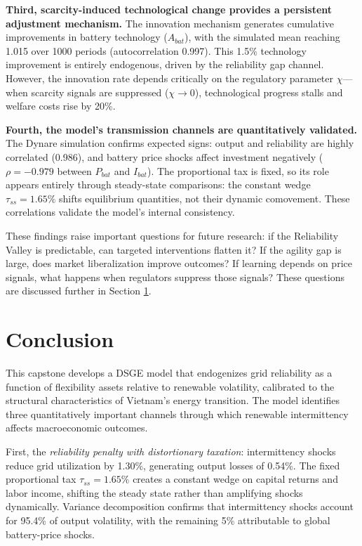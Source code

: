\documentclass[12pt, a4paper]{article}
\begin{document}
\textbf{Third, scarcity-induced technological change provides a persistent adjustment mechanism.} The innovation mechanism generates cumulative improvements in battery technology ($A_{bat}$), with the simulated mean reaching 1.015 over 1000 periods (autocorrelation 0.997). This 1.5\% technology improvement is entirely endogenous, driven by the reliability gap channel. However, the innovation rate depends critically on the regulatory parameter $\chi$---when scarcity signals are suppressed ($\chi \to 0$), technological progress stalls and welfare costs rise by 20\%.

\textbf{Fourth, the model's transmission channels are quantitatively validated.} The Dynare simulation confirms expected signs: output and reliability are highly correlated (0.986), and battery price shocks affect investment negatively ($\rho = -0.979$ between $P_{bat}$ and $I_{bat}$). The proportional tax is fixed, so its role appears entirely through steady-state comparisons: the constant wedge $\tau_{ss}=1.65\%$ shifts equilibrium quantities, not their dynamic comovement. These correlations validate the model's internal consistency.

These findings raise important questions for future research: if the Reliability Valley is predictable, can targeted interventions flatten it? If the agility gap is large, does market liberalization improve outcomes? If learning depends on price signals, what happens when regulators suppress those signals? These questions are discussed further in Section \ref{sec:conclusion}.

\section{Conclusion} \label{sec:conclusion}

This capstone develops a DSGE model that endogenizes grid reliability as a function of flexibility assets relative to renewable volatility, calibrated to the structural characteristics of Vietnam's energy transition. The model identifies three quantitatively important channels through which renewable intermittency affects macroeconomic outcomes.

First, the \textit{reliability penalty with distortionary taxation}: intermittency shocks reduce grid utilization by 1.30\%, generating output losses of 0.54\%. The fixed proportional tax $\tau_{ss}=1.65\%$ creates a constant wedge on capital returns and labor income, shifting the steady state rather than amplifying shocks dynamically. Variance decomposition confirms that intermittency shocks account for 95.4\% of output volatility, with the remaining 5\% attributable to global battery-price shocks.
\end{document}
